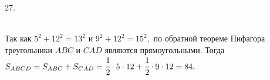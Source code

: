 27. \begin{figure}[ht!]
\end{figure}\\
Так как $5^2+12^2=13^2$ и $9^2+12^2=15^2,$ по обратной теореме Пифагора треугольники $ABC$ и $CAD$ являются прямоугольными. Тогда $S_{ABCD}=S_{ABC}+S_{CAD}=\cfrac{1}{2}\cdot5\cdot12+\cfrac{1}{2}\cdot9\cdot12=84.$\\
